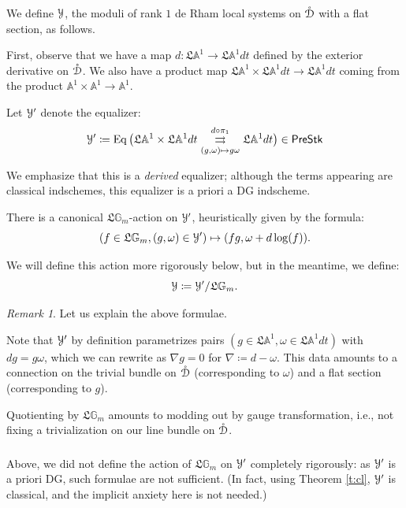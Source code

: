 \documentclass[reqno,11pt]{amsart}
\numberwithin{equation}{subsection}
\theoremstyle{remark}
\newtheorem{rem}[thm]{Remark}
\newcommand{\bA}{{\mathbb A}}
\newcommand{\bG}{{\mathbb G}}
\newcommand{\sD}{{\EuScript D}}
\newcommand{\sY}{{\EuScript Y}}
\newcommand{\fL}{{\mathfrak L}}
\newcommand{\on}{\operatorname}
\newcommand{\PreStk}{\mathsf{PreStk}}
\renewcommand{\o}[1]{\mathring{#1}}
\begin{document}
\subsubsection{}

We define $\sY$, the moduli of rank $1$ de Rham local systems on $\o{\sD}$
with a flat section, as follows.

First, observe that we have a map $d:\fL \bA^1 \to \fL \bA^1 dt$
defined by the exterior derivative on $\o{\sD}$.
We also have a product map $\fL \bA^1 \times \fL \bA^1 dt \to \fL \bA^1 dt$
coming from the product $\bA^1 \times \bA^1 \to \bA^1$.

Let $\sY^{\prime}$ denote the equalizer:
%
\[
\sY^{\prime} \coloneqq \on{Eq}
\big(\fL \bA^1 \times \fL \bA^1 dt 
\underset{(g,\omega) \mapsto g\omega}{\overset{d\circ \pi_1}{\rightrightarrows}}
\fL \bA^1 dt\big) \in \PreStk
\]

\noindent We emphasize that this is a \emph{derived} equalizer;
although the terms appearing are classical indschemes, this
equalizer is a priori a DG indscheme.

There is a canonical $\fL \bG_m$-action on $\sY^{\prime}$,
heuristically given by the formula:
%
\[
(f \in \fL \bG_m,(g,\omega) \in \sY^{\prime}) \mapsto 
(fg,\omega+d\log(f)).
\]

\noindent We will define this action more rigorously below,
but in the meantime, we define:
%
\[
\sY \coloneqq \sY^{\prime}/\fL \bG_m.
\]

\begin{rem}

Let us explain the above formulae.

Note that $\sY^{\prime}$ by definition parametrizes pairs
$(g \in \fL\bA^1, \omega \in \fL \bA^1 dt) $ with
$dg = g\omega$, which we can rewrite as 
$\nabla g = 0$ for $\nabla \coloneqq d - \omega$. 
This data amounts to a connection on the trivial bundle on $\o{\sD}$ 
(corresponding to $\omega$) and a flat section (corresponding to $g$). 

Quotienting by $\fL \bG_m$ amounts to modding out by gauge transformation,
i.e., not fixing a trivialization on our line bundle on $\o{\sD}$.

\end{rem}

\subsubsection{}\label{ss:action-rigorous}

Above, we did not define the action of $\fL \bG_m$ on $\sY^{\prime}$
completely rigorously: as $\sY^{\prime}$ is a priori DG, such
formulae are not sufficient. (In fact, using Theorem \ref{t:cl}, $\sY^{\prime}$
is classical, and the implicit anxiety here is not needed.)
\end{document}
